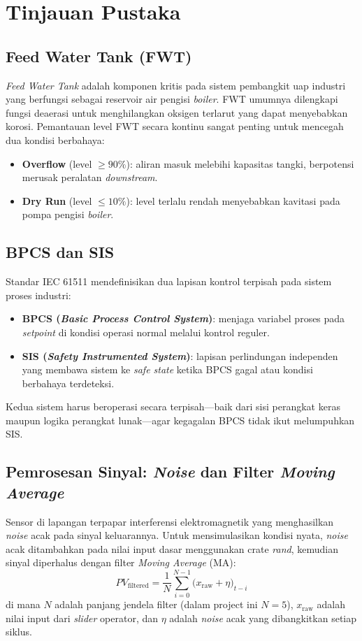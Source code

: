 \documentclass[12pt,a4paper]{article}
\begin{document}
\section{Tinjauan Pustaka}

\subsection{Feed Water Tank (FWT)}
\textit{Feed Water Tank} adalah komponen kritis pada sistem pembangkit uap
industri yang berfungsi sebagai reservoir air pengisi \textit{boiler}. FWT
umumnya dilengkapi fungsi deaerasi untuk menghilangkan oksigen terlarut yang
dapat menyebabkan korosi. Pemantauan level FWT secara kontinu sangat penting
untuk mencegah dua kondisi berbahaya:
\begin{itemize}
    \item \textbf{Overflow} (level $\geq 90\%$): aliran masuk melebihi
          kapasitas tangki, berpotensi merusak peralatan \textit{downstream}.
    \item \textbf{Dry Run} (level $\leq 10\%$): level terlalu rendah
          menyebabkan kavitasi pada pompa pengisi \textit{boiler}.
\end{itemize}

\subsection{BPCS dan SIS}
Standar IEC 61511 mendefinisikan dua lapisan kontrol terpisah pada sistem
proses industri:
\begin{itemize}
    \item \textbf{BPCS (\textit{Basic Process Control System})}: menjaga
          variabel proses pada \textit{setpoint} di kondisi operasi normal
          melalui kontrol reguler.
    \item \textbf{SIS (\textit{Safety Instrumented System})}: lapisan
          perlindungan independen yang membawa sistem ke \textit{safe state}
          ketika BPCS gagal atau kondisi berbahaya terdeteksi.
\end{itemize}
Kedua sistem harus beroperasi secara terpisah---baik dari sisi perangkat
keras maupun logika perangkat lunak---agar kegagalan BPCS tidak ikut
melumpuhkan SIS.

\subsection{Pemrosesan Sinyal: \textit{Noise} dan Filter \textit{Moving Average}}
Sensor di lapangan terpapar interferensi elektromagnetik yang menghasilkan
\textit{noise} acak pada sinyal keluarannya. Untuk mensimulasikan kondisi
nyata, \textit{noise} acak ditambahkan pada nilai input dasar menggunakan
crate \textit{rand}, kemudian sinyal diperhalus dengan filter
\textit{Moving Average} (MA):
\begin{equation}
    PV_{\text{filtered}} = \frac{1}{N}
    \sum_{i=0}^{N-1} \bigl(x_{\text{raw}} + \eta\bigr)_{t-i}
\end{equation}
di mana $N$ adalah panjang jendela filter (dalam project ini $N=5$),
$x_{\text{raw}}$ adalah nilai input dari \textit{slider} operator, dan
$\eta$ adalah \textit{noise} acak yang dibangkitkan setiap siklus.
\end{document}
